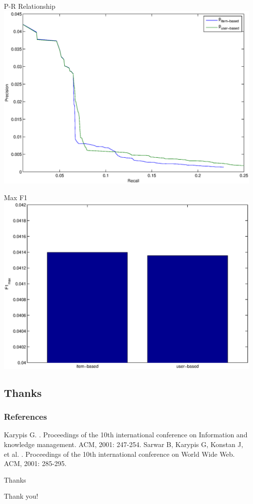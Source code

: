 \documentclass{beamer}
\begin{document}
\begin{frame}{P-R Relationship}
\includegraphics[width=\linewidth]{./base.eps}
\end{frame}

\begin{frame}{Max F1}
\includegraphics[width=\linewidth]{./base_f1.eps}
\end{frame}



\subsection*{Thanks}


\begin{frame}%
\frametitle<presentation>{References}
\begin{thebibliography}{10}
\beamertemplatearticlebibitems
{}
Karypis G.
.
\newblock Proceedings of the 10th international conference on Information and knowledge management. ACM, 2001: 247-254.
Sarwar B, Karypis G, Konstan J, et al.
.
\newblock Proceedings of the 10th international conference on World Wide Web. ACM, 2001: 285-295.
\end{thebibliography}
\end{frame}

\begin{frame}[fragile]{Thanks}
\begin{center}
{\huge Thank you!}
\end{center}
\end{frame}

\end{document}
